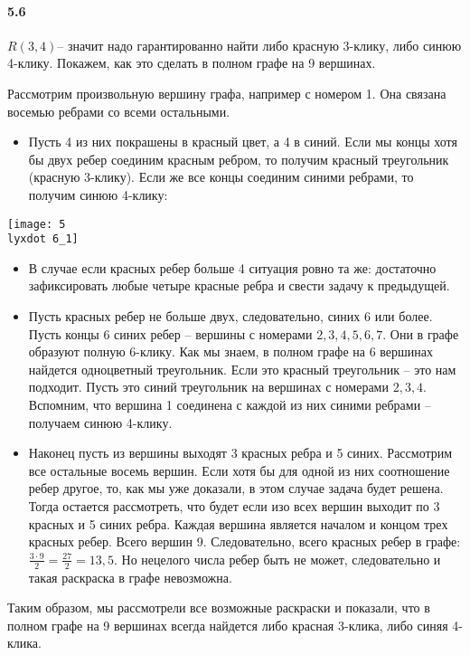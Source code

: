 \documentclass[russian]{article}
\newcommand{\lyxdot}{.}
\begin{document}
\paragraph{5.6}

$R(3,4)$-- значит надо гарантированно найти либо красную 3-клику,
либо синюю 4-клику. Покажем, как это сделать в полном графе на 9 вершинах.

Рассмотрим произвольную вершину графа, например с номером 1. Она связана
восемью ребрами со всеми остальными.
\begin{itemize}
\item Пусть 4 из них покрашены в красный цвет, а 4 в синий. Если мы концы
хотя бы двух ребер соединим красным ребром, то получим красный треугольник
(красную 3-клику). Если же все концы соединим синими ребрами, то получим
синюю 4-клику:
\end{itemize}
\begin{center}
\texttt{[image: 5\\lyxdot 6\_1]}
\par\end{center}
\begin{itemize}
\item В случае если красных ребер больше 4 ситуация ровно та же: достаточно
зафиксировать любые четыре красные ребра и свести задачу к предыдущей.
\item Пусть красных ребер не больше двух, следовательно, синих 6 или более.
Пусть концы 6 синих ребер -- вершины с номерами $2,3,4,5,6,7$. Они
в графе образуют полную 6-клику. Как мы знаем, в полном графе на 6
вершинах найдется одноцветный треугольник. Если это красный треугольник
-- это нам подходит. Пусть это синий треугольник на вершинах с номерами
$2,3,4$. Вспомним, что вершина 1 соединена с каждой из них синими
ребрами -- получаем синюю 4-клику.
\item Наконец пусть из вершины выходят 3 красных ребра и 5 синих. Рассмотрим
все остальные восемь вершин. Если хотя бы для одной из них соотношение
ребер другое, то, как мы уже доказали, в этом случае задача будет
решена. Тогда остается рассмотреть, что будет если изо всех вершин
выходит по 3 красных и 5 синих ребра. Каждая вершина является началом
и концом трех красных ребер. Всего вершин 9. Следовательно, всего
красных ребер в графе: $\frac{3\cdot9}{2}=\frac{27}{2}=13,5$. Но
нецелого числа ребер быть не может, следовательно и такая раскраска
в графе невозможна.
\end{itemize}
Таким образом, мы рассмотрели все возможные раскраски и показали,
что в полном графе на 9 вершинах всегда найдется либо красная 3-клика,
либо синяя 4-клика.
\end{document}
